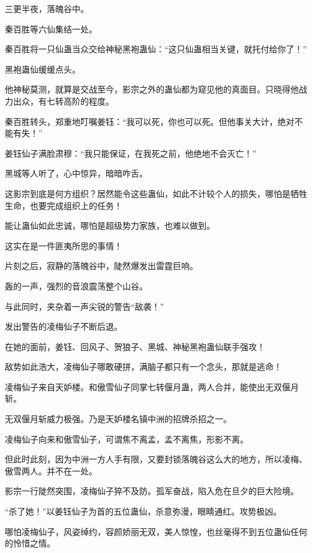 
\begin{this_body}

三更半夜，落魄谷中。

秦百胜等六仙集结一处。

秦百胜将一只仙蛊当众交给神秘黑袍蛊仙：“这只仙蛊相当关键，就托付给你了！”

黑袍蛊仙缓缓点头。

他神秘莫测，就算是交战至今，影宗之外的蛊仙都为窥见他的真面目。只晓得他战力出众，有七转高阶的程度。

秦百胜转头，郑重地叮嘱姜钰：“我可以死，你也可以死。但他事关大计，绝对不能有失！”

姜钰仙子满脸肃穆：“我只能保证，在我死之前，他绝地不会灭亡！”

黑城等人听了，心中惊异，暗暗咋舌。

这影宗到底是何方组织？居然能令这些蛊仙，如此不计较个人的损失，哪怕是牺牲生命，也要完成组织上的任务！

能让蛊仙如此忠诚，哪怕是超级势力家族，也难以做到。

这实在是一件匪夷所思的事情！

片刻之后，寂静的落魄谷中，陡然爆发出雷霆巨响。

轰的一声，强烈的音浪震荡整个山谷。

与此同时，夹杂着一声尖锐的警告“敌袭！”

发出警告的凌梅仙子不断后退。

在她的面前，姜钰、回风子、贺狼子、黑城、神秘黑袍蛊仙联手强攻！

敌势如此浩大，凌梅仙子哪敢硬拼，满脑子都只有一个念头，那就是逃命！

凌梅仙子来自天妒楼。和傲雪仙子同掌七转偃月蛊，两人合并，能使出无双偃月斩。

无双偃月斩威力极强。乃是天妒楼名镇中洲的招牌杀招之一。

凌梅仙子向来和傲雪仙子，可谓焦不离孟，孟不离焦，形影不离。

但此时此刻，因为中洲一方人手有限，又要封锁落魄谷这么大的地方，所以凌梅、傲雪两人。并不在一处。

影宗一行陡然突围，凌梅仙子猝不及防。孤军奋战，陷入危在旦夕的巨大险境。

“杀了她！”以姜钰仙子为首的五位蛊仙，杀意弥漫，眼睛通红。攻势极凶。

哪怕凌梅仙子，风姿绰约，容颜娇丽无双，美人惊惶，也丝毫得不到五位蛊仙任何的怜惜之情。


\end{this_body}

